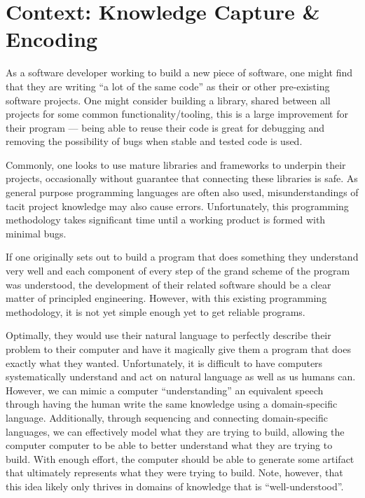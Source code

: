 \section{Context: Knowledge Capture \& Encoding}


As a software developer working to build a new piece of software, one might
find that they are writing ``a lot of the same code'' as their or other
pre-existing software projects. One might consider building a library, shared
between all projects for some common functionality/tooling, this is a large
improvement for their program --- being able to reuse their code is great for
debugging and removing the possibility of bugs when stable and tested code is
used.


Commonly, one looks to use mature libraries and frameworks to underpin their
projects, occasionally without guarantee that connecting these libraries is safe.
As general purpose programming languages are often also used, misunderstandings
of tacit project knowledge may also cause errors. Unfortunately, this
programming methodology takes significant time until a working product is formed
with minimal bugs.

If one originally sets out to build a program that does something they
understand very well and each component of every step of the grand scheme of the
program was understood, the development of their related software should be a
clear matter of principled engineering. However, with this existing programming
methodology, it is not yet simple enough yet to get reliable programs.

Optimally, they would use their natural language to perfectly describe their
problem to their computer and have it magically give them a program that does
exactly what they wanted. Unfortunately, it is difficult to have computers
systematically understand and act on natural language as well as us humans can.
However, we can mimic a computer ``understanding'' an equivalent speech through
having the human write the same knowledge using a domain-specific language.
Additionally, through sequencing and connecting domain-specific languages, we
can effectively model what they are trying to build, allowing the computer
computer to be able to better understand what they are trying to build. With
enough effort, the computer should be able to generate some artifact that
ultimately represents what they were trying to build. Note, however, that this
idea likely only thrives in domains of knowledge that is
``well\hyp{}understood''.

